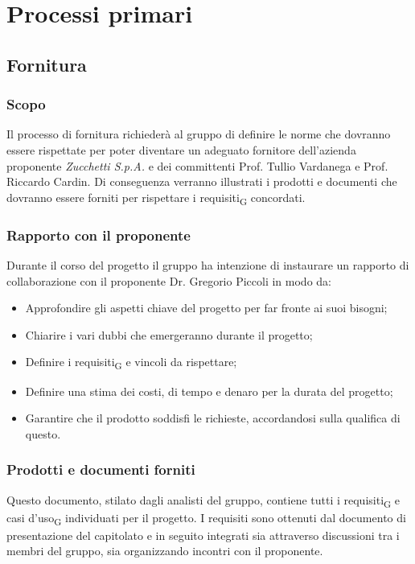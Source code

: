 \section{Processi primari}

\subsection{Fornitura}
\subsubsection{Scopo}
Il processo di fornitura richiederà al gruppo di definire le norme che dovranno essere rispettate per poter diventare un adeguato fornitore dell'azienda proponente \textit{Zucchetti S.p.A.} e dei committenti Prof. Tullio Vardanega e Prof. Riccardo Cardin. Di conseguenza verranno illustrati i prodotti e documenti che dovranno essere forniti per rispettare i requisiti\textsubscript{G} concordati.
\subsubsection{Rapporto con il proponente}
Durante il corso del progetto il gruppo ha intenzione di instaurare un rapporto di collaborazione con il proponente Dr. Gregorio Piccoli in modo da:
\begin{itemize}
	\item Approfondire gli aspetti chiave del progetto per far fronte ai suoi bisogni;
	\item Chiarire i vari dubbi che emergeranno durante il progetto;
	\item Definire i requisiti\textsubscript{G} e vincoli da rispettare;
	\item Definire una stima dei costi, di tempo e denaro per la durata del progetto;
	\item Garantire che il prodotto soddisfi le richieste, accordandosi sulla qualifica di questo.
\end{itemize} 

\subsubsection{Prodotti e documenti forniti}
Questo documento, stilato dagli analisti del gruppo, contiene tutti i requisiti\textsubscript{G} e casi d'uso\textsubscript{G} individuati per il progetto. I requisiti sono ottenuti dal documento di presentazione del capitolato e in seguito integrati sia attraverso discussioni tra i membri del gruppo, sia organizzando incontri con il proponente. 
